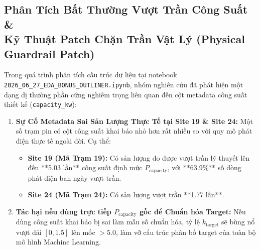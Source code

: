 \documentclass[12pt,a4paper]{article}
\begin{document}
\subsection[Phân Tích Bất Thường Vượt Trần Công Suất]{Phân Tích Bất Thường Vượt Trần Công Suất \&\\Kỹ Thuật Patch Chặn Trần Vật Lý (Physical Guardrail Patch)}
Trong quá trình phân tích cấu trúc dữ liệu tại notebook\\ \texttt{2026\_06\_27\_\allowbreak EDA\_\allowbreak BONUS\_\allowbreak OUTLINER.ipynb}, nhóm nghiên cứu đã phát hiện một dạng dị thường phần cứng nghiêm trọng liên quan đến cột metadata công suất thiết kế (\texttt{capacity\_kw}):

\begin{enumerate}
    \item \textbf{Sự Cố Metadata Sai Sản Lượng Thực Tế tại Site 19 \& Site 24:}  
    Một số trạm pin có cột công suất khai báo nhỏ hơn rất nhiều so với quy mô phát điện thực tế ngoài đời. Cụ thể:
    \begin{itemize}
        \item \textbf{Site 19 (Mã Trạm 19):} Có sản lượng đo được vượt trần lý thuyết lên đến **5.03 lần** công suất định mức $P_{\text{capacity}}$, với **63.9\%** số dòng phát điện ban ngày vượt trần.
        \item \textbf{Site 24 (Mã Trạm 24):} Có sản lượng vượt trần **1.77 lần**.
    \end{itemize}
    \item \textbf{Tác hại nếu dùng trực tiếp $P_{\text{capacity}}$ gốc để Chuẩn hóa Target:}  
    Nếu dùng công suất khai báo bị sai làm mẫu số chuẩn hóa, tỷ lệ $k_{\text{target}}$ sẽ bùng nổ vượt dải $[0, 1.5]$ lên mốc $> 5.0$, làm vỡ cấu trúc phân bố target của toàn bộ mô hình Machine Learning.
\end{enumerate}
\end{document}
